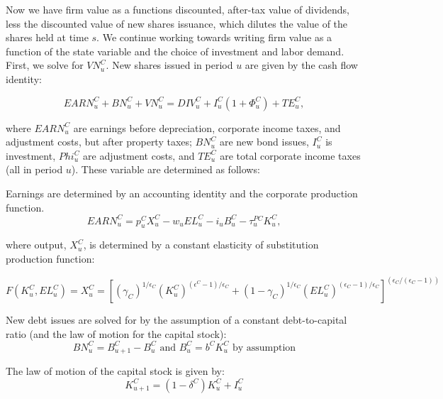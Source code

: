 Now we have firm value as a functions discounted, after-tax value of dividends, less the discounted value of new shares issuance, which dilutes the value of the shares held at time $s$.  We continue working towards writing firm value as a function of the state variable and the choice of investment and labor demand.  First, we solve for $VN^{C}_{u}$.  New shares issued in period $u$ are given by the cash flow identity:

\begin{equation}
\label{eqn:vn}
EARN^{C}_{u}+BN^{C}_{u}+VN^{C}_{u}=DIV^{C}_{u}+I^{C}_{u}(1+\Phi^{C}_{u})+TE^{C}_{u}, 
\end{equation}

where $EARN^{C}_{u}$ are earnings before depreciation, corporate income taxes, and adjustment costs, but after property taxes; $BN^{C}_{u}$ are new bond issues, $I^{C}_{u}$ is investment, $Phi^{C}_{u}$ are adjustment costs, and $TE^{C}_{u}$ are total corporate income taxes (all in period $u$).  These variable are determined as follows:

Earnings are determined by an accounting identity and the corporate production function.  
\begin{equation}
\label{eqn:earn}
EARN^{C}_{u}=p^{C}_{u}X^{C}_{u}-w_{u}EL^{C}_{u}-i_{u}B^{C}_{u}-\tau^{PC}_{u}K^{C}_{u},
\end{equation}

\noindent\noindent where output, $X^{C}_{u}$, is determined by a constant elasticity of substitution production function:

\begin{equation}
\label{eqn:prod_fun}
F(K^{C}_{u},EL^{C}_{u})=X^{C}_{u} = \left[(\gamma_{C})^{1/\epsilon_{C}}(K^{C}_{u})^{(\epsilon^{C}-1)/\epsilon_{C}}+(1-\gamma_{C})^{1/\epsilon_{C}}(EL^{C}_{u})^{(\epsilon_{C}-1)/\epsilon_{C}}\right]^{(\epsilon_{C}/(\epsilon_{C}-1))}
\end{equation}

New debt issues are solved for by the assumption of a constant debt-to-capital ratio (and the law of motion for the capital stock):
\begin{equation}
\label{eqn:debt}
BN^{C}_{u}=B^{C}_{u+1} - B^{C}_{u} \text{ and } B^{C}_{u}=b^{C}K^{C}_{u} \text{ by assumption} 
\end{equation}

The law of motion of the capital stock is given by:
\begin{equation}
\label{eqn:lom_capital}
K^{C}_{u+1}=(1-\delta^{C})K^{C}_{u} + I^{C}_{u}
\end{equation}

